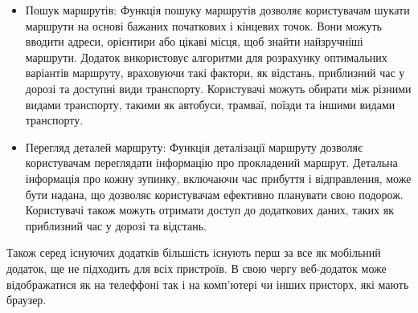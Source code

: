 \begin{itemize}
    \item Пошук маршрутів: Функція пошуку маршрутів дозволяє користувачам шукати маршрути на основі бажаних початкових і кінцевих точок. Вони можуть вводити адреси, орієнтири або цікаві місця, щоб знайти найзручніші маршрути. Додаток використовує алгоритми для розрахунку оптимальних варіантів маршруту, враховуючи такі фактори, як відстань, приблизний час у дорозі та доступні види транспорту. Користувачі можуть обирати між різними видами транспорту, такими як автобуси, трамваї, поїзди та іншими видами транспорту.\\

    \item Перегляд деталей маршруту: Функція деталізації маршруту дозволяє користувачам переглядати інформацію про прокладений маршрут. Детальна інформація про кожну зупинку, включаючи час прибуття і відправлення, може бути надана, що дозволяє користувачам ефективно планувати свою подорож. Користувачі також можуть отримати доступ до додаткових даних, таких як приблизний час у дорозі та відстань.\\

\end{itemize}


Також серед існуючих додатків більшість існують перш за все як мобільний додаток, ще не підходить для всіх пристроїв. В свою чергу веб-додаток може відображатися як на телеффоні так і на комп'ютері чи інших присторх, які мають браузер.